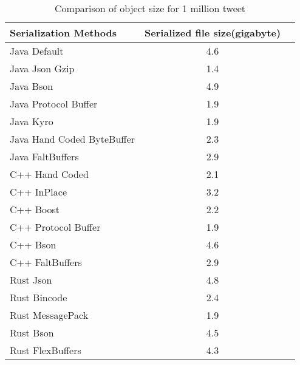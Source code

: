 \begin{table}
	\centering
	\caption{Comparison of object size for 1 million tweet }
	\label{tbl:object_size}
	\begin{adjustbox}{width=\columnwidth,center}	
		
		\begin{tabular}{|l|c|c|} \hline
		 \textbf{Serialization Methods} & \textbf{Serialized file size(gigabyte)}\\ \hline
			Java Default  & 4.6 \\ \hline	
			Java Json Gzip  & 1.4 \\ \hline	
			Java Bson  & 4.9 \\ \hline	
			Java Protocol Buffer  & 1.9 \\ \hline	
			Java Kyro  & 1.9 \\ \hline	
			Java Hand Coded ByteBuffer  & 2.3 \\ \hline	
			Java FaltBuffers  & 2.9 \\ \hline	
			C++ Hand Coded  & 2.1 \\ \hline	
			C++ InPlace  & 3.2 \\ \hline	
			C++ Boost  & 2.2 \\ \hline	
			C++ Protocol Buffer  & 1.9 \\ \hline
			C++ Bson  & 4.6 \\ \hline	
			C++ FaltBuffers  & 2.9 \\ \hline	
			Rust Json  & 4.8 \\ \hline
			Rust Bincode  & 2.4 \\ \hline			
			Rust MessagePack  & 1.9 \\ \hline			
			Rust Bson  & 4.5 \\ \hline			
			Rust FlexBuffers  & 4.3 \\ \hline						
			\hline\end{tabular}
	\end{adjustbox}
\end{table}

